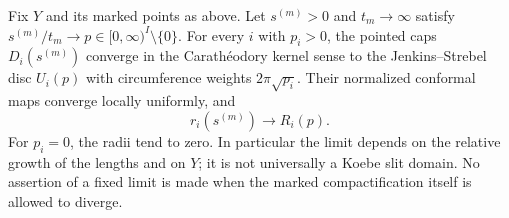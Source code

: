 \begin{theorem}\label{A2-cap-limit}
Fix $Y$ and its marked points as above. Let $s^{(m)}>0$ and $t_m\to\infty$
satisfy $s^{(m)}/t_m\to p\in[0,\infty)^I\setminus\{0\}$.
For every $i$ with $p_i>0$, the pointed caps $D_i(s^{(m)})$ converge in
the Carath\'eodory kernel sense to the Jenkins--Strebel disc $U_i(p)$
with circumference weights $2\pi\sqrt{p_i}$. Their normalized conformal
maps converge locally uniformly, and
\[
 r_i(s^{(m)})\longrightarrow R_i(p).
\]
For $p_i=0$, the radii tend to zero. In particular the limit depends
on the relative growth of the lengths and on $Y$; it is not universally
a Koebe slit domain. No assertion of a fixed limit is made when the
marked compactification itself is allowed to diverge.
\end{theorem}
